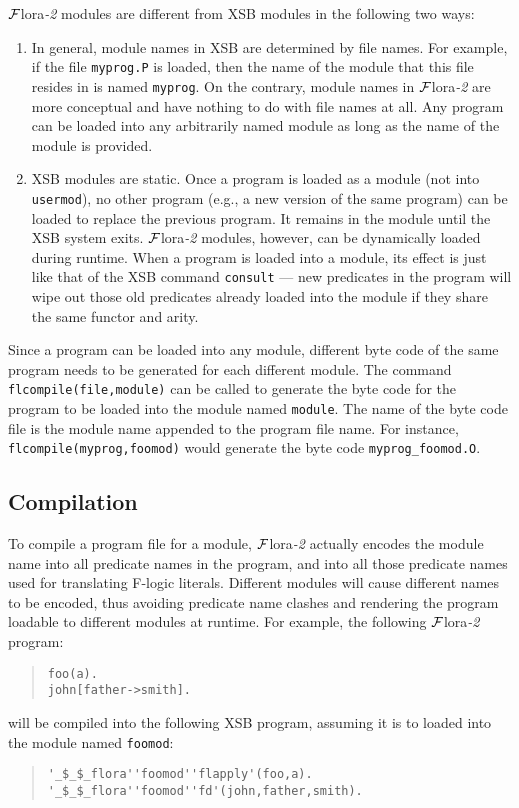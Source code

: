 \documentclass[11pt]{article}
\newcommand{\FLORA}{{\mbox{${\cal F}${\sc lora}\rm\emph{-2}}}\xspace}
\newcommand{\fl}{\mbox{F-logic}\xspace}
\begin{document}
%
\FLORA modules are different from XSB modules in the following two
ways:
\begin{enumerate}
\item In general, module names in XSB are determined by file names.
      For example, if the file {\tt myprog.P} is loaded, then the name
      of the module that this file resides in is named {\tt myprog}.
      On the contrary, module names in \FLORA are more conceptual and
      have nothing to do with file names at all. Any program can be
      loaded into any arbitrarily named module as long as the name of
      the module is provided.

\item XSB modules are static. Once a program is loaded as a module (not
      into {\tt usermod}), no other program (e.g., a new version of
      the same program) can be loaded to replace the previous program.
      It remains in the module until the XSB system exits. \FLORA modules,
      however, can be dynamically loaded during runtime. When a program
      is loaded into a module, its effect is just like that of the XSB
      command {\tt consult} --- new predicates in the program will wipe
      out those old predicates already loaded into the module if they
      share the same functor and arity.
\end{enumerate}

Since a program can be loaded into any module, different byte code of
the same program needs to be generated for each different module.  The
command {\tt flcompile(file,module)} can be called to generate the
byte code for the program to be loaded into the module named
{\tt module}. The name of the byte code file is the module name appended
to the program file name. For instance, {\tt flcompile(myprog,foomod)}
would generate the byte code {\tt myprog\_foomod.O}.


\subsection{Compilation} \label{sec:flora-modules-compilation}


%
To compile a program file for a module, \FLORA actually encodes the
module name into all predicate names in the program, and into all
those predicate names used for translating \fl literals. Different
modules will cause different names to be encoded, thus avoiding
predicate name clashes and rendering the program loadable to different
modules at runtime.  For example, the following \FLORA program:
\begin{quote}
\begin{verbatim}
foo(a).
john[father->smith].
\end{verbatim}
\end{quote}
will be compiled into the following XSB program, assuming it is to
loaded into the module named {\tt foomod}:
\begin{quote}
\begin{verbatim}
'_$_$_flora''foomod''flapply'(foo,a).
'_$_$_flora''foomod''fd'(john,father,smith).
\end{verbatim}
\end{quote}
\end{document}
